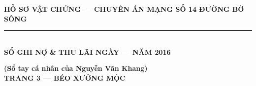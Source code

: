 \documentclass[12pt,a4paper]{article}
\begin{document}
\begin{center}
    \fontsize{11pt}{13pt}\selectfont
    \textbf{HỒ SƠ VẬT CHỨNG — CHUYÊN ÁN MẠNG SỐ 14 ĐƯỜNG BỜ SÔNG}\\[-0.2em]
    \rule{6cm}{0.6pt}\\[0.5cm]
    \textbf{\Large  SỔ GHI NỢ \& THU LÃI NGÀY — NĂM 2016}\\[0.15cm]
    \textit{}
\end{center}
\vspace{0.3cm}

\vspace{0.3cm}\noindent\textbf{\large (Sổ tay cá nhân của Nguyễn Văn Khang)}\\[0.15cm]




\vspace{0.35cm}\noindent\textbf{\large TRANG 3 — BÉO XƯỞNG MỘC}\\[0.15cm]
\end{document}
